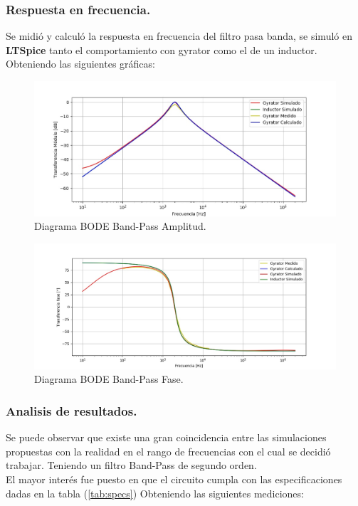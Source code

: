 \documentclass[a4paper]{article}
\begin{document}
\subsubsection{Respuesta en frecuencia.}
Se midió y calculó la respuesta en frecuencia del filtro pasa banda, se simuló en \textbf{LTSpice}  tanto el comportamiento con gyrator como el de un inductor. Obteniendo las siguientes gráficas:
\begin{figure}[H]	
	\centering
	\includegraphics[width=\textwidth]{ImagenesEj2/bodebp.jpg}
	\caption{Diagrama BODE Band-Pass Amplitud.}
	\label{fig:bodebp}
\end{figure}
\begin{figure}[H]	
	\centering
	\includegraphics[width=\textwidth]{ImagenesEj2/bodebpp.jpg}
	\caption{Diagrama BODE Band-Pass Fase.}
	\label{fig:bodebpp}
\end{figure}


\subsubsection{Analisis de resultados.}
Se puede observar que existe una gran coincidencia entre las simulaciones propuestas con la realidad en el rango de frecuencias con el cual se decidió trabajar. Teniendo un filtro Band-Pass de segundo orden.\\
El mayor interés fue puesto en que el circuito cumpla con las especificaciones dadas en la tabla (\ref{tab:specs})
Obteniendo las siguientes mediciones:
\end{document}
